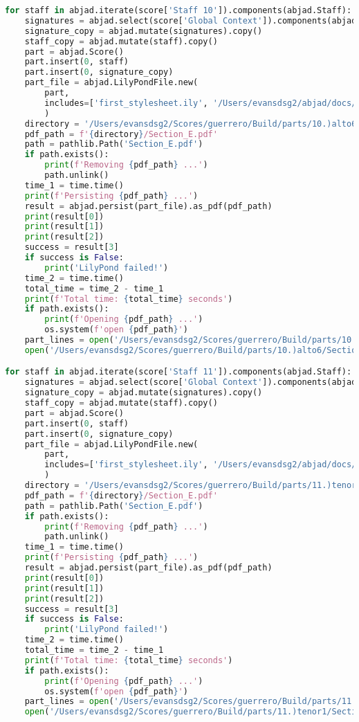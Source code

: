 \begin{lstlisting}[language=Python, caption=Invocation Source Code]
for staff in abjad.iterate(score['Staff 10']).components(abjad.Staff):
    signatures = abjad.select(score['Global Context']).components(abjad.Staff)
    signature_copy = abjad.mutate(signatures).copy()
    staff_copy = abjad.mutate(staff).copy()
    part = abjad.Score()
    part.insert(0, staff)
    part.insert(0, signature_copy)
    part_file = abjad.LilyPondFile.new(
        part,
        includes=['first_stylesheet.ily', '/Users/evansdsg2/abjad/docs/source/_stylesheets/abjad.ily'],
        )
    directory = '/Users/evansdsg2/Scores/guerrero/Build/parts/10.)alto6'
    pdf_path = f'{directory}/Section_E.pdf'
    path = pathlib.Path('Section_E.pdf')
    if path.exists():
        print(f'Removing {pdf_path} ...')
        path.unlink()
    time_1 = time.time()
    print(f'Persisting {pdf_path} ...')
    result = abjad.persist(part_file).as_pdf(pdf_path)
    print(result[0])
    print(result[1])
    print(result[2])
    success = result[3]
    if success is False:
        print('LilyPond failed!')
    time_2 = time.time()
    total_time = time_2 - time_1
    print(f'Total time: {total_time} seconds')
    if path.exists():
        print(f'Opening {pdf_path} ...')
        os.system(f'open {pdf_path}')
    part_lines = open('/Users/evansdsg2/Scores/guerrero/Build/parts/10.)alto6/Section_E.ly').readlines()
    open('/Users/evansdsg2/Scores/guerrero/Build/parts/10.)alto6/Section_E.ly', 'w').writelines(part_lines[15:-1])

for staff in abjad.iterate(score['Staff 11']).components(abjad.Staff):
    signatures = abjad.select(score['Global Context']).components(abjad.Staff)
    signature_copy = abjad.mutate(signatures).copy()
    staff_copy = abjad.mutate(staff).copy()
    part = abjad.Score()
    part.insert(0, staff)
    part.insert(0, signature_copy)
    part_file = abjad.LilyPondFile.new(
        part,
        includes=['first_stylesheet.ily', '/Users/evansdsg2/abjad/docs/source/_stylesheets/abjad.ily'],
        )
    directory = '/Users/evansdsg2/Scores/guerrero/Build/parts/11.)tenor1'
    pdf_path = f'{directory}/Section_E.pdf'
    path = pathlib.Path('Section_E.pdf')
    if path.exists():
        print(f'Removing {pdf_path} ...')
        path.unlink()
    time_1 = time.time()
    print(f'Persisting {pdf_path} ...')
    result = abjad.persist(part_file).as_pdf(pdf_path)
    print(result[0])
    print(result[1])
    print(result[2])
    success = result[3]
    if success is False:
        print('LilyPond failed!')
    time_2 = time.time()
    total_time = time_2 - time_1
    print(f'Total time: {total_time} seconds')
    if path.exists():
        print(f'Opening {pdf_path} ...')
        os.system(f'open {pdf_path}')
    part_lines = open('/Users/evansdsg2/Scores/guerrero/Build/parts/11.)tenor1/Section_E.ly').readlines()
    open('/Users/evansdsg2/Scores/guerrero/Build/parts/11.)tenor1/Section_E.ly', 'w').writelines(part_lines[15:-1])


\end{lstlisting}
